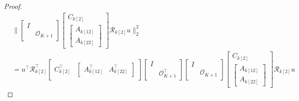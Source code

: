 \documentclass[doctype=mastersthesis,BCOR=15mm,biblatex]{ldvbook}%
\newcommand{\R}{\mathcal{R}} %
\newcommand{\Ob}{\mathcal{O}} %
\newcommand{\eye}{I} %
\begin{document}
\begin{proof}
\begin{align}
		&\Bigg\|
	\begin{bmatrix}
	\eye & \\
	& \Ob_{K+1}
	\end{bmatrix}
	\begin{bmatrix}
	C_{k[2]}\\
	\begin{bmatrix}
	A_{k[12]}\\
	A_{k[22]}
	\end{bmatrix}
	\end{bmatrix}  \R_{k[2]} u\Bigg\|_2^2
	\\
	&=
	u^\top
	\R_{k[2]}^\top
	\begin{bmatrix}
	C_{k[2]}^\top&
	\begin{bmatrix}
	A_{k[12]}^\top&
	A_{k[22]}^\top
	\end{bmatrix}
	\end{bmatrix} 
	\begin{bmatrix}
	\eye & \\
	& \Ob_{K+1}^\top
	\end{bmatrix} 
	\begin{bmatrix}
	\eye & \\
	& \Ob_{K+1}
	\end{bmatrix}
	\begin{bmatrix}
	C_{k[2]}\\
	\begin{bmatrix}
	A_{k[12]}\\
	A_{k[22]}
	\end{bmatrix}
	\end{bmatrix}  
	\R_{k[2]} u
\end{align}

\end{proof}
\end{document}
